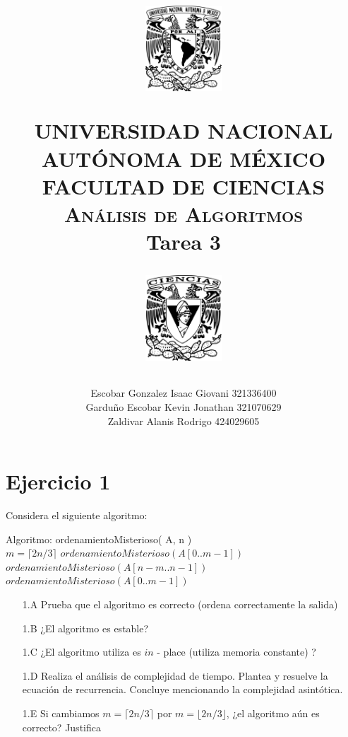 \documentclass[12pt]{article}
\title{
		\vspace{-0.7in}
		\usefont{OT1}{bch}{b}{n}
		\begin{minipage}{3cm}
        \vspace{-0.5in}
    	\begin{center}
    		\includegraphics[height=3.2cm]{../logo_unam.png}
    	\end{center}
    \end{minipage}\hfill
    \begin{minipage}{10.7cm}

    	\begin{center}
\normalfont \normalsize \textsc{UNIVERSIDAD NACIONAL AUTÓNOMA DE MÉXICO \\ FACULTAD DE CIENCIAS \\ Análisis de Algoritmos } \\
		\huge Tarea 3
    	\end{center}

    \end{minipage}\hfill
    \begin{minipage}{3.2cm}
    \vspace{-0.5in}
    	\begin{center}
    		\includegraphics[height=3.2cm]{../logo_fc.png}
    	\end{center}
    \end{minipage}

\author{Escobar Gonzalez Isaac Giovani \hspace{1cm} 321336400\\
        Garduño Escobar Kevin Jonathan \hspace{0.5cm} 321070629\\
        Zaldivar Alanis Rodrigo \hspace{2.75cm} 424029605 }
\date{}
}
\begin{document}
\maketitle

\section*{Ejercicio 1}
Considera el siguiente algoritmo:\\
\LinesNumbered
\renewcommand{\algorithmcfname}{Algoritmo}
\begin{algorithm}[H]
    Algoritmo: ordenamientoMisterioso( A, n )\\
     {
        $m = \lceil 2n/3\rceil$\;
        $ordenamientoMisterioso(A[0 .. m-1])$ \;
        $ordenamientoMisterioso(A[n-m .. n-1])$ \;
        $ordenamientoMisterioso(A[0 .. m-1])$ \;
    }
\end{algorithm}
\begin{itemize}
    \item[1.A] Prueba que el algoritmo es correcto (ordena correctamente la salida)
    \item[1.B] ¿El algoritmo es estable?
    \item[1.C] ¿El algoritmo utiliza es $in$ - place (utiliza memoria constante) ?
    \item[1.D] Realiza el análisis de complejidad de tiempo. Plantea y resuelve la ecuación de recurrencia. Concluye mencionando la complejidad asintótica.
    \item[1.E] Si cambiamos $m = \lceil 2n/3 \rceil$ por $m = \lfloor 2n/3 \rfloor$, ¿el algoritmo aún es correcto? Justifica
\end{itemize}
\end{document}
